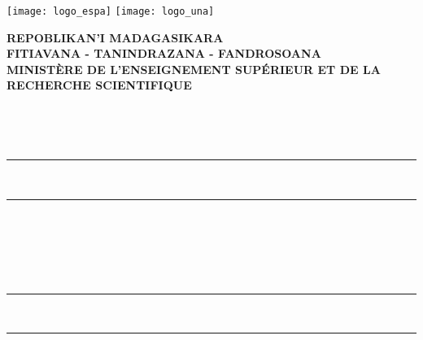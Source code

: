 \makeatletter
{}
  \begin{titlepage}
	\texttt{[image: logo\_espa]}
	\hfill \texttt{[image: logo\_una]}\\
	\parbox{9cm}{
	\begin{center}
	\vspace*{-30 mm}\large\textbf{REPOBLIKAN'I MADAGASIKARA}\\
	\small\textbf{FITIAVANA - TANINDRAZANA - FANDROSOANA}\\
	\vspace*{0.2 cm}
	\normalsize\textbf{MINISTÈRE DE L'ENSEIGNEMENT SUPÉRIEUR ET DE LA RECHERCHE SCIENTIFIQUE}\\
	\end{center}
	 }
	 \centering
	 \parbox{\textwidth}{
	\begin{center}
		\vspace*{4 mm} 
	 	\normalsize\large\textbf{\@ecole}
	\end{center}
	 }
\\
	\centering\parbox{\textwidth}{
		\begin{center}
		\large\textbf{\@departement} 
		\end{center}			
	}
\\
	\centering\parbox{\textwidth}{
		\begin{center}
		\color{black}\rule{\textwidth}{1.5pt}\\
		\vspace*{-0.42 cm}
		\rule{\textwidth}{0.5pt}\\
		\end{center}			
	}\\
	\vspace*{-0.7 cm}
	\centering\parbox{\textwidth}{
		\begin{center}
		\begin{normalsize}
		\color{black} 
		\textbf{\@typeRapport}
		\end{normalsize}
		\end{center}			
	}\\
	\vspace*{-0.7 cm}
	\centering\parbox{\textwidth}{
		\begin{center}
		\color{black}\rule{\textwidth}{0.5pt}\\
		\vspace*{-0.38 cm}
		\rule{\textwidth}{1.5pt}\\	
		\end{center}			
	}\\
		\centering\parbox{\textwidth}{
		\begin{center}		
		\large\textbf{\@specialite} \\			
		\end{center}			
	}\\
	\vfill
		\parbox{\textwidth}{		
		\begin{center}
       		{\Huge \color[rgb]{0,0,0} \bfseries{\@title}} \\	
		\end{center}
		}
	\vfill
	

\end{titlepage}
